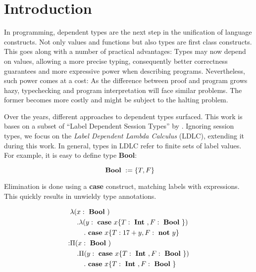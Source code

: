 \newcommand{\case}{\text{ \textbf{case} }}
\newcommand{\Bool}{\text{ \textbf{Bool} }}
\newcommand{\Int}{\text{ \textbf{Int} }}
\newcommand{\notf}{\text{ \textbf{not} }}

\chapter{Introduction}\label{chap:introduction}

In programming, dependent types are the next step in the unification of language constructs. Not only values and functions but also types are first class constructs. This goes along with a number of practical advantages: Types may now depend on values, allowing a more precise typing, consequently better correctness guarantees and more expressive power when describing programs. Nevertheless, such power comes at a cost: As the difference between proof and program grows hazy, typechecking and program interpretation will face similar problems. The former becomes more costly and might be subject to the halting problem.

Over the years, different approaches to dependent types surfaced. This work is bases on a subset of ``Label Dependent Session Types'' by \cite{thiemann2019}. Ignoring session types, we focus on the \emph{Label Dependent Lambda Calculus} (LDLC), extending it during this work. In general, types in LDLC refer to finite sets of label values. For example, it is easy to define type \textbf{Bool}:

\begin{equation}
\Bool    := \{T, F\}
\end{equation}

Elimination is done using a \textbf{case} construct, matching labels with expressions. This quickly results in unwieldy type annotations.

\begin{equation}\label{eqn:ldlc}
\begin{split}
&\lambda (x: \Bool) \\
&\quad . \lambda (y: \case x \{T: \Int, F: \Bool\} ) \\
&\qquad . \case x \{T: 17+y,F: \notf y\} \\
: & \Pi(x : \Bool) \\
&\quad . \Pi (y: \case x \{T: \Int, F: \Bool\} ) \\
&\qquad . \case x \{T: \Int, F: \Bool \}
\end{split}
\end{equation}

